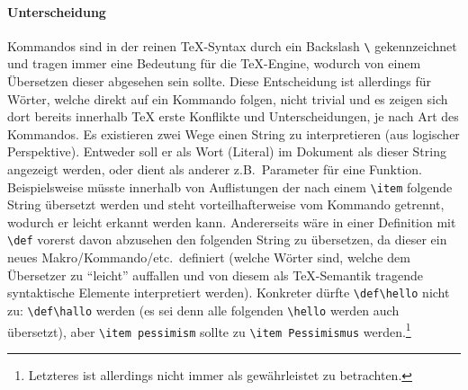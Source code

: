 \paragraph*{Unterscheidung}\par
Kommandos sind in der reinen \TeX{}-Syntax durch ein Backslash \verb|\| gekennzeichnet und tragen immer eine Bedeutung für die \TeX{}-Engine, wodurch von einem Übersetzen dieser abgesehen sein sollte. 
Diese Entscheidung ist allerdings für Wörter, welche direkt auf ein Kommando folgen, nicht trivial und es zeigen sich dort bereits innerhalb \TeX{} erste Konflikte und Unterscheidungen, je nach Art des Kommandos.
Es existieren zwei Wege einen String zu interpretieren (aus logischer Perspektive). Entweder soll er als Wort (Literal) im Dokument als dieser String angezeigt werden, oder dient als anderer z.B.\ Parameter für eine Funktion.%
Beispielsweise müsste innerhalb von Auflistungen der nach einem \verb|\item| folgende String übersetzt werden und steht vorteilhafterweise vom Kommando getrennt, wodurch er leicht erkannt werden kann. Andererseits wäre in einer Definition mit \verb|\def| vorerst davon abzusehen den folgenden String zu übersetzen, da dieser ein neues Makro/Kommando/etc.\ definiert (welche Wörter sind, welche dem Übersetzer zu \enquote{leicht} auffallen und von diesem als \TeX{}-Semantik tragende syntaktische Elemente interpretiert werden). 
Konkreter dürfte \verb|\def\hello| nicht zu: \verb|\def\hallo| werden (es sei denn alle folgenden \verb|\hello| werden auch übersetzt), aber \verb|\item pessimism| sollte zu \verb|\item Pessimismus| werden.\footnote{Letzteres ist allerdings nicht immer als gewährleistet zu betrachten.}%




